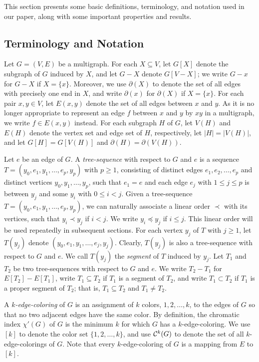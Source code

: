\documentclass[11pt]{article}
\begin{document}
This section presents some basic definitions, terminology, and notation used in our paper, along with some important 
properties and results.

\subsection{Terminology and Notation}

Let $G=(V,E)$ be a multigraph.  For each $X \subseteq V$, let $G[X]$ denote the subgraph of $G$ induced by $X$, and let 
$G-X$ denote $G[V-X]$; we write $G-x$ for $G-X$ if $X=\{x\}$. Moreover, we use $\partial(X)$ to denote the set of all 
edges with precisely one end in $X$, and write $\partial(x)$ for $\partial(X)$ if $X=\{x\}$. For each pair $x, y 
\in V$, let $E(x,y)$ denote the set of all edges between $x$ and $y$. As it is no longer appropriate to represent 
an edge $f$ between $x$ and $y$ by $xy$ in a multigraph, we write $f \in E(x,y)$ instead. For each subgraph $H$ of $G$, 
let $V(H)$ and $E(H)$ denote the vertex set and edge set of $H$, respectively, let $|H|=|V(H)|$, and let $G[H]=G[V(H)]$ and $\partial(H) =\partial(V(H))$.     

Let $e$ be an edge of $G$. A {\em tree-sequence}\label{tsequence} with respect to $G$ and $e$ is a sequence 
$T=(y_0,e_1,y_1, \ldots, e_p, y_p)$ with $p\ge 1$, consisting of distinct edges $e_1,e_2, \ldots, e_p$ and 
distinct vertices $y_0,y_1, \ldots, y_p$, such that $e_1=e$ and each edge $e_j$ with $1\le j \le p$ is between 
$y_j$ and some $y_i$ with $0\le i <j$.  Given a tree-sequence $T=(y_0,e_1,y_1, \ldots, e_p, y_p)$, we can naturally 
associate a linear order $\prec$ with its vertices, such that $y_i \prec y_j$ if $i<j$. We
write $y_i \preceq y_j$ if $i\le j$.  This linear order will be used repeatedly in subsequent sections.
For each vertex $y_j$ of $T$ with $j \ge 1$, let $T(y_j)$ denote $(y_0,e_1,y_1, \ldots, e_j, y_j)$. Clearly, 
$T(y_j)$ is also a tree-sequence with respect to $G$ and $e$. We call $T(y_j)$ the {\em segment}\label{segment} of $T$ induced
by $y_j$. Let $T_1$ and $T_2$ be two tree-sequences with respect to $G$ and $e$. We write $T_2-T_1$ for 
$E[T_2]-E[T_1]$, write $T_1 \subseteq T_2$ if $T_1$ is a segment of $T_2$, and write $T_1 \subset T_2$ if $T_1$ 
is a proper segment of $T_2$; that is, $T_1 \subseteq T_2$ and $T_1 \ne T_2$. 

A {\em $k$-edge-coloring}\label{kedgecoloring} of $G$ is an assignment of $k$ colors, $1,2, \ldots, k$, to the edges of $G$ 
so that no two adjacent edges have the same color. By definition, the chromatic index $\chi'(G)$ of $G$ is the minimum $k$ 
for which $G$ has a $k$-edge-coloring.  We use $[k]$ to denote the color set $\{1,2, \ldots, k\}$,
and use ${\cal C}^k(G)$ to denote the set of all $k$-edge-colorings of $G$. Note that every $k$-edge-coloring
of $G$ is a mapping from $E$ to $[k]$.
\end{document}
